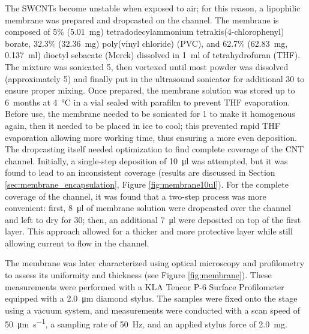 The SWCNTs become unstable when exposed to air; for this reason, a lipophilic membrane was prepared and dropcasted on the channel.
The membrane is composed of 5\% (\SI{5.01}{\mg}) tetradodecylammonium tetrakis(4-chlorophenyl) borate, 32.3\% (\SI{32.36}{\mg}) poly(vinyl chloride) (PVC), and 62.7\% (\SI{62.83}{\mg}, \ie{} \SI{0.137}{\ml}) dioctyl sebacate (Merck) dissolved in \SI{1}{\ml} of tetrahydrofuran (THF). The mixture was sonicated \SI{5}{\min}, then vortexed until most powder was dissolved (approximately \SI{5}{\min}) and finally put in the ultrasound sonicator for additional \SI{30}{\min} to ensure proper mixing. Once prepared, the membrane solution was stored up to \SI{6}{months} at \SI{4}{\degreeCelsius} in a vial sealed with parafilm to prevent THF evaporation. 
Before use, the membrane needed to be sonicated for \SI{1}{\min} to make it homogenous again, then it needed to be placed in ice to cool; this prevented rapid THF evaporation allowing more working time, thus ensuring a more even deposition. The dropcasting itself needed optimization to find complete coverage of the CNT channel. Initially, a single-step deposition of \SI{10}{\ul} was attempted, but it was found to lead to an inconsistent coverage (results are discussed in Section \ref{sec:membrane_encapsulation}, Figure \ref{fig:membrane10ul}). For the complete coverage of the channel, it was found that a two-step process was more convenient: first, \SI{8}{\ul} of membrane solution were dropcasted over the channel and left to dry for \SI{30}{\min}; then, an additional \SI{7}{\ul} were deposited on top of the first layer. This approach allowed for a thicker and more protective layer while still allowing current to flow in the channel.

The membrane was later characterized using optical microscopy and profilometry to assess its uniformity and thickness (see Figure \ref{fig:membrane}). These measurements were performed with a KLA Tencor P-6 Surface Profilometer equipped with a \SI{2.0}{\um} diamond stylus. The samples were fixed onto the stage using a vacuum system, and measurements were conducted with a scan speed of \SI{50}{\um\per\second}, a sampling rate of \SI{50}{\hertz}, and an applied stylus force of \SI{2.0}{\mg}.

